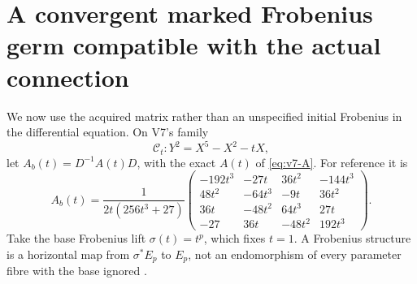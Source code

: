 \documentclass[11pt]{article}
\theoremstyle{definition}
\theoremstyle{remark}
\begin{document}
\section{A convergent marked Frobenius germ compatible with the actual connection}
\label{sec:v11-horizontal}

We now use the acquired matrix rather than an unspecified initial
Frobenius in the differential equation. On V7's family
\[
 \mathcal C_t:Y^2=X^5-X^2-tX,
\]
let $A_b(t)=D^{-1}A(t)D$, with the exact $A(t)$ of
\cref{eq:v7-A}. For reference it is
\begin{equation}
 A_b(t)=\frac1{2t(256t^3+27)}
 \begin{pmatrix}
 -192t^3&-27t&36t^2&-144t^3\\
 48t^2&-64t^3&-9t&36t^2\\
 36t&-48t^2&64t^3&27t\\
 -27&36t&-48t^2&192t^3
 \end{pmatrix}.
 \label{eq:v11-Ab}
\end{equation}
Take the base Frobenius lift $\sigma(t)=t^p$, which fixes $t=1$.
A Frobenius structure is a horizontal map from $\sigma^*E_p$ to
$E_p$, not an endomorphism of every parameter fibre with the base
ignored \cite{KedlayaFrobBook,KedlayaTuitman}.
\end{document}
